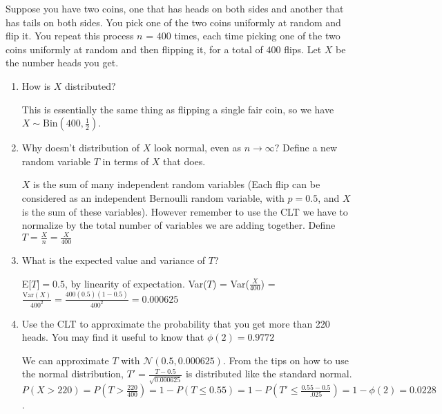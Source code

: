 \question Suppose you have two coins, one that has heads on both sides and another that has tails on both sides. You pick one of the two coins uniformly at random and flip it. You repeat this process $n$ = $400$ times, each time picking one of the two coins uniformly at random and then flipping it, for a total of $400$ flips. Let $X$ be the number heads you get.\newline 
\begin{enumerate}[label=(\alph*)]
\item How is $X$ distributed?
\begin{solution}[1cm]
This is essentially the same thing as flipping a single fair coin, so we have $X \mathtt{\sim} \mathrm{Bin}(400, \frac{1}{2})$.
\end{solution}
\item Why doesn't distribution of $X$ look normal, even as $n \to \infty?$  Define a new random variable $T$ in terms of $X$ that does.
\begin{solution}[1cm] 
$X$ is the sum of many independent random variables (Each flip can be considered as an independent Bernoulli random variable, with $p = 0.5$, and $X$ is the sum of these variables). However remember to use the CLT we have to normalize by the total number of variables we are adding together. Define $T = \frac{X}{n} = \frac{X}{400}$
\end{solution}   
\item What is the expected value and variance of $T$?
\begin{solution}[1cm]
E[$T] = 0.5$, by linearity of expectation. Var($T$) = Var($\frac{X}{400}$)  = $\frac{\text{Var}(X)}{400^2} = \frac{400(0.5)(1-0.5)}{400^2} = 0.000625$
\end{solution}
\item Use the CLT to approximate the probability that you get more than 220 heads. You may find it useful to know that $\phi(2) = 0.9772$
\begin{solution}[1cm] 
We can approximate $T$ with $\mathcal{N}(0.5, 0.000625)$. From the tips on how to use the normal distribution, $T' = \frac{T-0.5}{\sqrt{0.000625}}$ is distributed like the standard normal. 
$P(X>220) = P(T>\frac{220}{400}) = 1 - P(T \leq 0.55) = 1 - P(T' \leq \frac{0.55-0.5}{.025}) = 1 - \phi(2) = 0.0228$.
\end{solution}

\end{enumerate}

